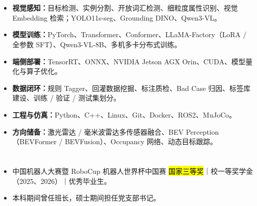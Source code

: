 \section[专业技能]{}
\begin{itemize}
    \item \textbf{视觉感知：}目标检测、实例分割、开放词汇检测、细粒度属性识别、视觉 Embedding 检索；YOLO11s-seg、Grounding DINO、Qwen3-VL。
    \item \textbf{模型训练：}PyTorch、Transformer、Conformer、LLaMA-Factory（LoRA / 全参数 SFT）、Qwen3-VL-8B、多机多卡分布式训练。
    \item \textbf{端侧部署：}TensorRT、ONNX、NVIDIA Jetson AGX Orin、CUDA、模型量化与算子优化。
    \item \textbf{数据闭环：}规则 Tagger、回灌数据挖掘、标注质检、Bad Case 归因、标签库建设、训练 / 验证 / 测试集划分。
    \item \textbf{工程与仿真：}Python、C++、Linux、Git、Docker、ROS2、MuJoCo。
    \item \textbf{方向储备：}激光雷达 / 毫米波雷达多传感器融合、BEV Perception（BEVFormer / BEVFusion）、Occupancy 网络、动态目标跟踪。
\end{itemize}

\section[荣誉与综合素质]{}
\begin{itemize}
    \item 中国机器人大赛暨 RoboCup 机器人世界杯中国赛 \hl{国家三等奖}｜校一等奖学金（2025、2026）｜优秀毕业生。
    \item 本科期间曾任班长，硕士期间担任党支部书记。
\end{itemize}


